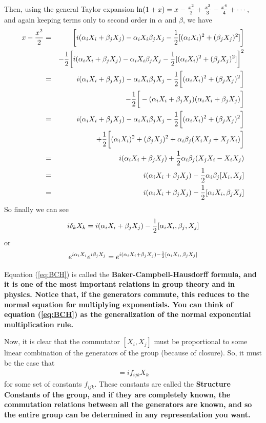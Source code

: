 \documentclass[12pt,epsf]{article}
\def\nolabel{\nonumber }
\def\nolabel{\nonumber }
\begin{document}
Then, using the general Taylor expansion $\ln(1+x) = x-{x^2\over
2}+{x^3\over 3}-{x^4 \over 4} + \cdots$, and again keeping terms only to
second order in $\alpha$ and $\beta$, we have 
\begin{eqnarray}
x-{x^2\over 2} &=&
\bigg[i(\alpha_iX_i+\beta_jX_j)-\alpha_iX_i\beta_jX_j -
{1\over2}[(\alpha_iX_i)^2+(\beta_jX_j)^2]\bigg] \nolabel \\
\;& & - {1\over 2}\bigg[i(\alpha_iX_i+\beta_jX_j)-\alpha_iX_i\beta_jX_j
- {1\over 2}[(\alpha_iX_i)^2+(\beta_jX_j)^2]\bigg]^2 \nolabel \\
&=& i (\alpha_iX_i+\beta_jX_j)-\alpha_iX_i\beta_jX_j - {1\over
2}\bigg[(\alpha_iX_i)^2+(\beta_jX_j)^2\bigg] \nolabel \\
\; & & - {1\over
2}\bigg[-(\alpha_iX_i+\beta_jX_j)(\alpha_iX_i+\beta_jX_j)\bigg]
\nolabel \\
&=& i(\alpha_iX_i+\beta_jX_j)-\alpha_iX_i\beta_jX_j - {1\over
2}\bigg[(\alpha_iX_i)^2+(\beta_jX_j)^2\bigg] \nolabel \\
\; & & + {1\over 2}\bigg[(\alpha_iX_i)^2+(\beta_jX_j)^2+
\alpha_i\beta_j(X_iX_j+X_jX_i)\bigg] \nolabel \\
&=& i(\alpha_iX_i+\beta_jX_j)+{1\over 2}\alpha_i\beta_j(X_jX_i-X_iX_j)
\nolabel \\
&=& i(\alpha_iX_i+\beta_jX_j)-{1\over2} \alpha_i\beta_j[X_i,X_j]
\nolabel \\
&=& i(\alpha_iX_i + \beta_jX_j)-{1\over 2}[\alpha_iX_i,\beta_jX_j]
\nolabel
\end{eqnarray}
So finally we can see 
\begin{eqnarray}
i\delta_kX_k = i(\alpha_iX_i+\beta_jX_j) - {1\over
2}[\alpha_iX_i,\beta_j,X_j] \nolabel 
\end{eqnarray}
or 
\begin{eqnarray}
e^{i\alpha_iX_i}e^{i\beta_jX_j} = e^{i(\alpha_iX_i+\beta_jX_j) -
{1\over 2}[\alpha_iX_i, \, \beta_j X_j]} \label{eq:BCH}
\end{eqnarray}

Equation (\ref{eq:BCH}) is called the \bf Baker-Campbell-Hausdorff \rm
formula, and it is one of the most important relations in group theory
and in physics.  Notice that, if the generators commute, this reduces
to the normal equation for multiplying exponentials.  You can think of
equation (\ref{eq:BCH}) as the generalization of the normal exponential
multiplication rule.  

Now, it is clear that the commutator $[X_i,X_j]$ must be proportional
to some linear combination of the generators of the group (because of
closure).  So, it must be the case that 
\begin{eqnarray}
[X_i,X_j] = if_{ijk}X_k \label{eq:structureconstants}
\end{eqnarray}
for some set of constants $f_{ijk}$.  These constants are called the
\bf Structure Constants \rm of the group, and if they are completely
known, the commutation relations between all the generators are known,
and so the entire group can be determined in any representation you
want.  
\end{document}
